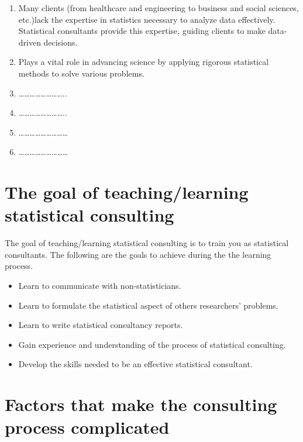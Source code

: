 \documentclass[
  letterpaper,
  DIV=11,
  numbers=noendperiod]{scrreprt}
\begin{document}
\begin{enumerate}
\def\labelenumi{\arabic{enumi}.}
\item
  Many clients (from healthcare and engineering to business and social
  sciences, etc.)lack the expertise in statistics necessary to analyze
  data effectively. Statistical consultants provide this expertise,
  guiding clients to make data-driven decisions.
\item
  Plays a vital role in advancing science by applying rigorous
  statistical methods to solve various problems.
\item
  \ldots\ldots\ldots\ldots\ldots\ldots\ldots\ldots..
\item
  \ldots\ldots\ldots\ldots\ldots\ldots\ldots\ldots..
\item
  \ldots\ldots\ldots\ldots\ldots\ldots\ldots\ldots\ldots{}
\item
  \ldots\ldots\ldots\ldots\ldots\ldots\ldots\ldots\ldots{}
\end{enumerate}

\section{The goal of teaching/learning statistical
consulting}\label{the-goal-of-teachinglearning-statistical-consulting}

The goal of teaching/learning statistical consulting is to train you as
statistical consultants. The following are the goals to achieve during
the the learning process.

\begin{itemize}
\item
  Learn to communicate with non-statisticians.
\item
  Learn to formulate the statistical aspect of others researchers'
  problems.
\item
  Learn to write statistical consultancy reports.
\item
  Gain experience and understanding of the process of statistical
  consulting.
\item
  Develop the skills needed to be an effective statistical consultant.
\end{itemize}

\section{Factors that make the consulting process
complicated}\label{factors-that-make-the-consulting-process-complicated}
\end{document}
